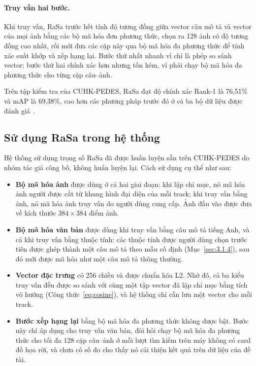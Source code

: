 \paragraph{Truy vấn hai bước.} Khi truy vấn, RaSa trước hết tính độ tương đồng giữa vector câu mô tả và vector của mọi ảnh bằng các bộ mã hóa đơn phương thức, chọn ra 128 ảnh có độ tương đồng cao nhất, rồi mới đưa các cặp này qua bộ mã hóa đa phương thức để tính xác suất khớp và xếp hạng lại. Bước thứ nhất nhanh vì chỉ là phép so sánh vector; bước thứ hai chính xác hơn nhưng tốn kém, vì phải chạy bộ mã hóa đa phương thức cho từng cặp câu--ảnh.

Trên tập kiểm tra của CUHK-PEDES, RaSa đạt độ chính xác Rank-1 là 76,51\% và mAP là 69,38\%, cao hơn các phương pháp trước đó ở cả ba bộ dữ liệu được đánh giá~\cite{bai2023rasa}.

\subsection{Sử dụng RaSa trong hệ thống}
\label{sec:3.5.4}

Hệ thống sử dụng trọng số RaSa đã được huấn luyện sẵn trên CUHK-PEDES do nhóm tác giả công bố, không huấn luyện lại. Cách sử dụng cụ thể như sau:
\begin{itemize}
    \item \textbf{Bộ mã hóa ảnh} được dùng ở cả hai giai đoạn: khi lập chỉ mục, nó mã hóa ảnh người được cắt từ khung hình đại diện của mỗi track; khi truy vấn bằng ảnh, nó mã hóa ảnh truy vấn do người dùng cung cấp. Ảnh đầu vào được đưa về kích thước $384 \times 384$ điểm ảnh.
    \item \textbf{Bộ mã hóa văn bản} được dùng khi truy vấn bằng câu mô tả tiếng Anh, và cả khi truy vấn bằng thuộc tính: các thuộc tính được người dùng chọn trước tiên được ghép thành một câu mô tả theo mẫu cố định (Mục~\ref{sec:3.1.4}), sau đó mới được mã hóa như một câu mô tả thông thường.
    \item \textbf{Vector đặc trưng} có 256 chiều và được chuẩn hóa L2. Nhờ đó, cả ba kiểu truy vấn đều được so sánh với cùng một tập vector đã lập chỉ mục bằng tích vô hướng (Công thức~\ref{eq:cosine}), và hệ thống chỉ cần lưu một vector cho mỗi track.
    \item \textbf{Bước xếp hạng lại} bằng bộ mã hóa đa phương thức không được bật. Bước này chỉ áp dụng cho truy vấn văn bản, đòi hỏi chạy bộ mã hóa đa phương thức cho tối đa 128 cặp câu--ảnh ở mỗi lượt tìm kiếm trên máy không có card đồ họa rời, và chưa có số đo cho thấy nó cải thiện kết quả trên dữ liệu của đề tài.
\end{itemize}

